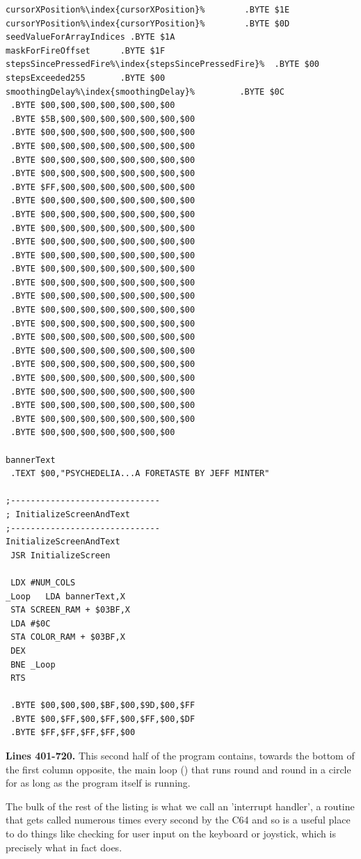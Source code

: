 \begin{minipage}[b]{0.33\linewidth}
\begin{lrbox}{\mybox}
\begin{lstlisting}[basicstyle=\ttfamily\tiny,escapechar=\%]
cursorXPosition%\index{cursorXPosition}%        .BYTE $1E
cursorYPosition%\index{cursorYPosition}%        .BYTE $0D
seedValueForArrayIndices .BYTE $1A
maskForFireOffset      .BYTE $1F
stepsSincePressedFire%\index{stepsSincePressedFire}%  .BYTE $00
stepsExceeded255       .BYTE $00
smoothingDelay%\index{smoothingDelay}%         .BYTE $0C
 .BYTE $00,$00,$00,$00,$00,$00,$00
 .BYTE $5B,$00,$00,$00,$00,$00,$00,$00
 .BYTE $00,$00,$00,$00,$00,$00,$00,$00
 .BYTE $00,$00,$00,$00,$00,$00,$00,$00
 .BYTE $00,$00,$00,$00,$00,$00,$00,$00
 .BYTE $00,$00,$00,$00,$00,$00,$00,$00
 .BYTE $FF,$00,$00,$00,$00,$00,$00,$00
 .BYTE $00,$00,$00,$00,$00,$00,$00,$00
 .BYTE $00,$00,$00,$00,$00,$00,$00,$00
 .BYTE $00,$00,$00,$00,$00,$00,$00,$00
 .BYTE $00,$00,$00,$00,$00,$00,$00,$00
 .BYTE $00,$00,$00,$00,$00,$00,$00,$00
 .BYTE $00,$00,$00,$00,$00,$00,$00,$00
 .BYTE $00,$00,$00,$00,$00,$00,$00,$00
 .BYTE $00,$00,$00,$00,$00,$00,$00,$00
 .BYTE $00,$00,$00,$00,$00,$00,$00,$00
 .BYTE $00,$00,$00,$00,$00,$00,$00,$00
 .BYTE $00,$00,$00,$00,$00,$00,$00,$00
 .BYTE $00,$00,$00,$00,$00,$00,$00,$00
 .BYTE $00,$00,$00,$00,$00,$00,$00,$00
 .BYTE $00,$00,$00,$00,$00,$00,$00,$00
 .BYTE $00,$00,$00,$00,$00,$00,$00,$00
 .BYTE $00,$00,$00,$00,$00,$00,$00,$00
 .BYTE $00,$00,$00,$00,$00,$00,$00,$00
 .BYTE $00,$00,$00,$00,$00,$00,$00

bannerText   
 .TEXT $00,"PSYCHEDELIA...A FORETASTE BY JEFF MINTER"

;------------------------------
; InitializeScreenAndText
;------------------------------
InitializeScreenAndText   
 JSR InitializeScreen

 LDX #NUM_COLS
_Loop   LDA bannerText,X
 STA SCREEN_RAM + $03BF,X
 LDA #$0C
 STA COLOR_RAM + $03BF,X
 DEX 
 BNE _Loop
 RTS 

 .BYTE $00,$00,$00,$BF,$00,$9D,$00,$FF
 .BYTE $00,$FF,$00,$FF,$00,$FF,$00,$DF
 .BYTE $FF,$FF,$FF,$FF,$00

\end{lstlisting}
\end{lrbox}%
\scalebox{0.8}{\usebox{\mybox}}
\end{minipage}
\clearpage
\textbf{Lines 401-720. } This second half of the program contains, towards the bottom of the first column
opposite, the main loop () that
runs round and round in a circle for as long as the program itself is running. 

The bulk of the rest of the listing
is what we call an 'interrupt handler', a routine that gets called numerous times every second by the C64
and so is a useful place to do things like checking for user input on the keyboard or joystick, which
is precisely what  in fact does.

